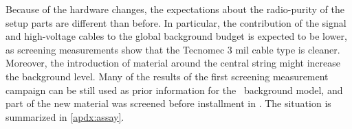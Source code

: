 
Because of the hardware changes, the expectations about the radio-purity of
the setup parts are different than before. In particular, the contribution of the signal
and high-voltage cables to the global background budget is expected to be lower, as
screening measurements show that the Tecnomec 3 mil cable type is cleaner. Moreover, the
introduction of material around the central string might increase the background level.
Many of the results of the first screening measurement campaign can be still used as prior
information for the \phasetwop\ background model, and part of the new material was
screened before installment in \gerda. The situation is summarized in \cref{apdx:assay}.


